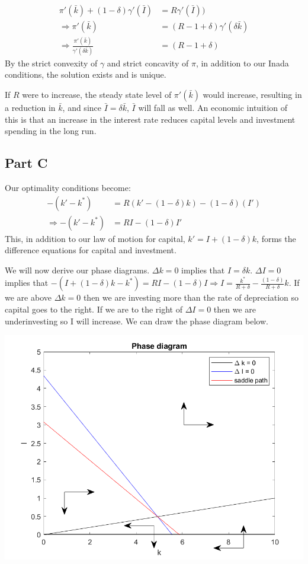 \documentclass[11pt]{article} %
\begin{document}
\begin{align*}
\pi '(\bar{k}) + (1-\delta) \gamma '(\bar{I}) &= R \gamma'(\bar{I}))\\
\Rightarrow \pi'(\bar{k}) &= (R-1 + \delta)\gamma'(\delta \bar{k})\\
\Rightarrow \frac{ \pi'(\bar{k})}{\gamma'(\delta \bar{k})} &= (R-1+ \delta)
\end{align*}
 By the strict convexity of $\gamma$ and strict concavity of $\pi$, in addition to our Inada conditions, the solution exists and is unique.

If $R$ were to increase, the steady state level of $\pi'(\bar{k})$ would increase, resulting in a reduction in $\bar{k}$, and since $\bar{I} = \delta \bar{k}$, $\bar{I}$ will fall as well. An economic intuition of this is that an increase in the interest rate reduces capital levels and investment spending in the long run.

\subsection{Part C}
Our optimality conditions become:
\begin{align*}
-(k'-k^{*}) &= R(k' - (1-\delta)k) - (1-\delta)(I')\\
\Rightarrow -(k'-k^{*}) &= RI -(1-\delta)I'
\end{align*}
This, in addition to our law of motion for capital, $k' = I + (1-\delta)k$, forms the difference equations for capital and investment.

We will now derive our phase diagrams. $\Delta k = 0$ implies that $I = \delta k$. $\Delta I = 0$ implies that $-(I + (1-\delta)k - k^{*}) = RI - (1-\delta)I \Rightarrow I = \frac{k^{*}}{R+\delta} - \frac{(1-\delta)}{R+\delta}k$. If we are above $\Delta k = 0$ then we are investing more than the rate of depreciation so capital goes to the right. If we are to the right of $\Delta I=0$ then we are underinvesting so I will increase. We can draw the phase diagram below.

\includegraphics{phase3}
\end{document}
